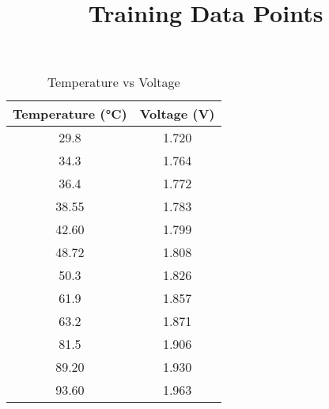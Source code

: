 \documentclass{article}
\title{Training Data Points}
\author{} %
\date{}   %
\begin{document}
\maketitle

\begin{table}[h!]
\centering
\begin{tabular}{|c|c|}
\hline
\textbf{Temperature (°C)} & \textbf{Voltage (V)} \\ \hline
29.8 & 1.720 \\ \hline
34.3 & 1.764 \\ \hline
36.4 & 1.772 \\ \hline
38.55 & 1.783 \\ \hline
42.60 & 1.799 \\ \hline
48.72 & 1.808 \\ \hline
50.3 & 1.826 \\ \hline
61.9 & 1.857 \\ \hline
63.2 & 1.871 \\ \hline
81.5 & 1.906 \\ \hline
89.20 & 1.930 \\ \hline
93.60 & 1.963 \\ \hline
\end{tabular}
\caption{Temperature vs Voltage}
\label{tab:temp_voltage}
\end{table}
\end{document}
